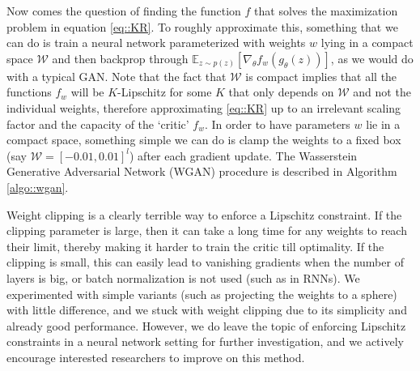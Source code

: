 \documentclass{article} %
\newcommand\EE{\mathbb{E}}
\theoremstyle{definition}
\theoremstyle{definition}
\begin{document}
Now comes the question of finding the function $f$ that
solves the maximization problem in equation \eqref{eq::KR}.
To roughly approximate
this, something that we can do is train a neural network
parameterized with weights $w$ lying in a compact space
$\mathcal{W}$ and then backprop through
$\EE_{z \sim p(z)}[\nabla_\theta f_w(g_\theta(z))]$, as we
would do with a typical GAN. Note that the fact that 
$\mathcal{W}$ is compact implies that all the functions
$f_w$ will be $K$-Lipschitz for some $K$ that only depends
on $\mathcal{W}$ and not the individual weights, therefore
approximating \eqref{eq::KR} up to an irrelevant scaling factor
and the capacity of the `critic' $f_w$. In order to have parameters $w$
lie in a compact space, something simple we can do is clamp
the weights to a fixed box (say $\mathcal{W} = [-0.01,0.01]^l$) after each
gradient update. The Wasserstein Generative Adversarial
Network (WGAN) procedure is described in Algorithm \autoref{algo::wgan}.

Weight clipping is a clearly terrible way to enforce a Lipschitz constraint.
If the clipping parameter is large, then it can take a long time
for any weights to reach their limit, thereby making it harder
to train the critic till optimality. If the clipping is small, this
can easily lead to vanishing gradients when the number of layers is big,
or batch normalization is not used (such as in RNNs). We experimented
with simple variants (such as projecting the weights to a sphere) with
little difference, and we stuck with weight clipping due to its simplicity
and already good performance. However, we do leave the topic of
enforcing Lipschitz constraints in a neural network setting for further
investigation, and we actively encourage interested researchers to improve
on this method.
\end{document}

